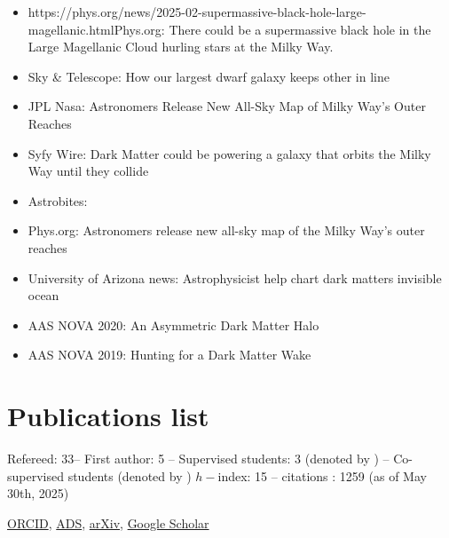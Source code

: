 \documentclass[14pt]{article}
\begin{document}
\begin{itemize}
  \setlength\itemsep{0.0em}
  \renewcommand\labelitemi{$\cdot$}
  \item
    {https://phys.org/news/2025-02-supermassive-black-hole-large-magellanic.html}{Phys.org: There
    could be a supermassive black hole in the Large Magellanic Cloud hurling
  stars at the Milky Way}.
  \item Sky \& Telescope: How our largest dwarf galaxy keeps other in line
  \item JPL Nasa: Astronomers Release New All-Sky Map of Milky Way’s Outer Reaches
  \item Syfy Wire: Dark Matter could be powering a galaxy that orbits the Milky Way until they collide
  \item Astrobites: 
  \item Phys.org: Astronomers release new all-sky map of the Milky Way's outer reaches
 \item University of Arizona news: Astrophysicist help chart dark matters invisible ocean
 \item AAS NOVA 2020: An Asymmetric Dark Matter Halo
 \item AAS NOVA 2019: Hunting for a Dark Matter Wake

\end{itemize}




\section*{Publications list}

Refereed: 33-- First author: 5 -- Supervised students: 3 (denoted by \dag ) --
Co-supervised students (denoted by \ddag) $h-$index: 15 -- citations : 1259 (as of May 30th, 2025) 

\noindent \href{https://orcid.org/0000-0001-7107-1744}{ORCID},
\href{https://ui.adsabs.harvard.edu/search/q=docs(library%2F0X5_bcuLT4iE-6-Nko0kmg)&sort=date%20desc%2C%20bibcode%20desc&p_=0}{ADS},
\href{https://arxiv.org/search/?query=garavito-camargo&searchtype=all}{arXiv},
\href{https://scholar.google.com/citations?user=QDLiOFYAAAAJ&hl=en&oi=ao}{Google
Scholar}\\
\end{document}
